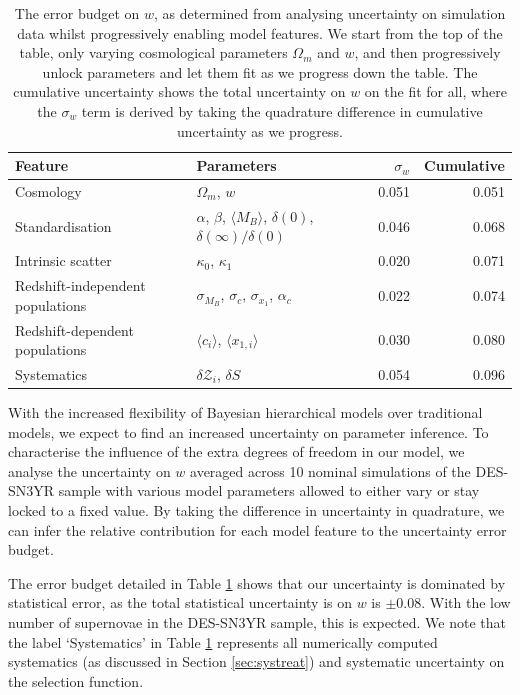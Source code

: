 \documentclass[a4paper,fleqn,usenatbib]{emulateapj}
\begin{document}
\begin{table}
	\centering
	\caption{The error budget on $w$, as determined from analysing uncertainty on simulation data whilst progressively enabling model features. We start from the top of the table, only varying cosmological parameters $\Omega_m$ and $w$, and then progressively unlock parameters and let them fit as we progress down the table. The cumulative uncertainty shows the total uncertainty on $w$ on the fit for all, where the $\sigma_w$ term is derived by taking the quadrature difference in cumulative uncertainty as we progress.}
	\label{tab:uncert}
	\begin{tabular}{l|l|rr}
		Feature &  Parameters & $\sigma_w$ & Cumulative  \\
		\hline
		Cosmology                      & $\Omega_m$, $w$ & 0.051  &   0.051       \\
		Standardisation                & $\alpha$, $\beta$, $\langle M_B \rangle$, $\delta(0)$, $\delta(\infty)/\delta(0)$ & 0.046  &   0.068       \\
		Intrinsic scatter              & $\kappa_0$, $\kappa_1$ & 0.020  &   0.071       \\
		Redshift-independent populations             & $\sigma_{M_B}$, $\sigma_c$, $\sigma_{x_1}$, $\alpha_c$ & 0.022  &   0.074       \\
		Redshift-dependent populations & $\langle c_i \rangle$, $\langle x_{1,i} \rangle$ & 0.030  &   0.080   \\
		Systematics                    & $\delta \mathcal{Z}_i$, $\delta S$ & 0.054  &   0.096      \\ 
		\hline
	\end{tabular}
\end{table}

With the increased flexibility of Bayesian hierarchical models over traditional models, we expect to find an increased uncertainty on parameter inference. To characterise the influence of the extra degrees of freedom in our model, we analyse the uncertainty on $w$ averaged across 10 nominal simulations of the DES-SN3YR sample with various model parameters allowed to either vary or stay locked to a fixed value. By taking the difference in uncertainty in quadrature, we can infer the relative contribution for each model feature to the uncertainty error budget.


The error budget detailed in Table \ref{tab:uncert} shows that our uncertainty is dominated by statistical error, as the total statistical uncertainty is on $w$ is $\pm0.08$. With the low number of supernovae in the DES-SN3YR sample, this is expected. We note that the label `Systematics' in Table \ref{tab:uncert} represents all numerically computed systematics (as discussed in Section \ref{sec:systreat}) and systematic uncertainty on the selection function.
\end{document}
